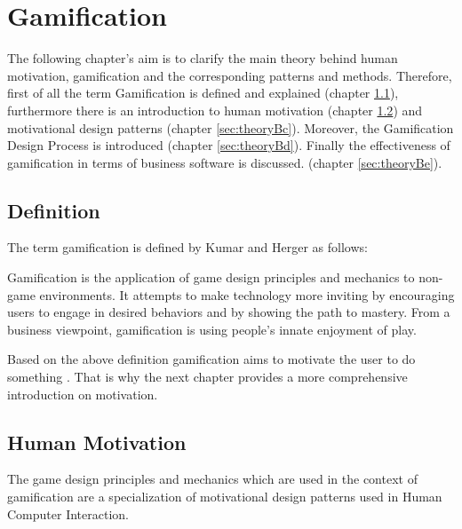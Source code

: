 \newpage
\section{Gamification}
\label{sec:theoryB}

The following chapter's aim is to clarify the main theory behind human motivation, gamification and the corresponding patterns and methods. Therefore, first of all the term Gamification is defined and explained (chapter \ref{sec:theoryBa}), furthermore there is an introduction to human motivation (chapter \ref{sec:theoryBb}) and motivational design patterns (chapter \ref{sec:theoryBc}). Moreover, the Gamification Design Process is introduced (chapter \ref{sec:theoryBd}). Finally the effectiveness of gamification in terms of business software is discussed. (chapter \ref{sec:theoryBe}).


\subsection{Definition}
\label{sec:theoryBa}

The term gamification is defined by Kumar and Herger as follows:

\begin{fquote}
	Gamification is the application of game design principles and mechanics to
	non-game environments. It attempts to make technology more inviting by encouraging users to engage in desired behaviors and by showing the path to mastery.
	From a business viewpoint, gamification is using people’s innate enjoyment of play.
\end{fquote}

Based on the above definition gamification aims to motivate the user to do something \cite[p. 8]{kumarGamificationWorkDesigning2013}. That is why the next chapter provides a more comprehensive introduction on motivation. 


\subsection{Human Motivation}
\label{sec:theoryBb}

The game design principles and mechanics which are used in the context of gamification are a specialization of motivational design patterns used in Human Computer Interaction. \cite[p. 59]{kumarGamificationWorkDesigning2013}

